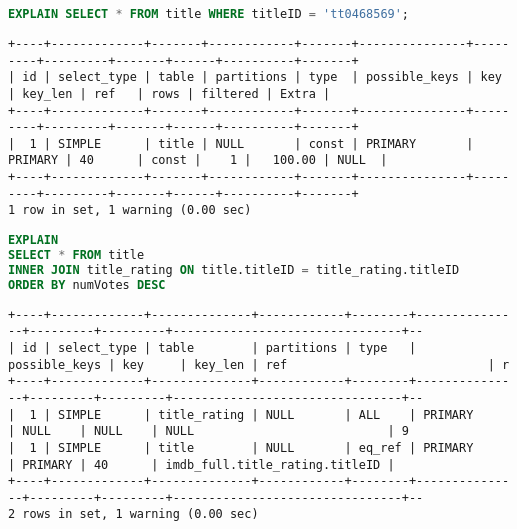 \documentclass[12pt,a4paper]{article}
\begin{document}
\begin{lstlisting}[language=SQL]
EXPLAIN SELECT * FROM title WHERE titleID = 'tt0468569';
\end{lstlisting}
\begin{lstlisting}[basicstyle = \tiny\ttfamily, columns = fixed]
+----+-------------+-------+------------+-------+---------------+---------+---------+-------+------+----------+-------+
| id | select_type | table | partitions | type  | possible_keys | key     | key_len | ref   | rows | filtered | Extra |
+----+-------------+-------+------------+-------+---------------+---------+---------+-------+------+----------+-------+
|  1 | SIMPLE      | title | NULL       | const | PRIMARY       | PRIMARY | 40      | const |    1 |   100.00 | NULL  |
+----+-------------+-------+------------+-------+---------------+---------+---------+-------+------+----------+-------+
1 row in set, 1 warning (0.00 sec)
\end{lstlisting}

\begin{lstlisting}[language=SQL]
EXPLAIN
SELECT * FROM title
INNER JOIN title_rating ON title.titleID = title_rating.titleID
ORDER BY numVotes DESC
\end{lstlisting}

\begin{lstlisting}[basicstyle = \tiny\ttfamily, columns = fixed]
+----+-------------+--------------+------------+--------+---------------+---------+---------+--------------------------------+--
| id | select_type | table        | partitions | type   | possible_keys | key     | key_len | ref                            | r
+----+-------------+--------------+------------+--------+---------------+---------+---------+--------------------------------+--
|  1 | SIMPLE      | title_rating | NULL       | ALL    | PRIMARY       | NULL    | NULL    | NULL                           | 9
|  1 | SIMPLE      | title        | NULL       | eq_ref | PRIMARY       | PRIMARY | 40      | imdb_full.title_rating.titleID |  
+----+-------------+--------------+------------+--------+---------------+---------+---------+--------------------------------+--
2 rows in set, 1 warning (0.00 sec)
\end{lstlisting}
\end{document}
